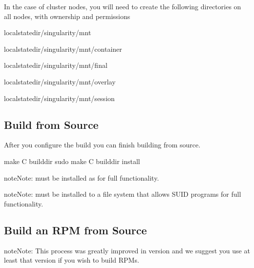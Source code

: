 \documentclass[letterpaper,10pt,english]{sphinxmanual}
\begin{document}
In the case of cluster nodes, you will need to create the following
directories on all nodes, with  ownership and  permissions

%
\begin{sphinxVerbatim}[commandchars=\\\{\}]
\PYGZdl{}\PYGZob{}localstatedir\PYGZcb{}/singularity/mnt

\PYGZdl{}\PYGZob{}localstatedir\PYGZcb{}/singularity/mnt/container

\PYGZdl{}\PYGZob{}localstatedir\PYGZcb{}/singularity/mnt/final

\PYGZdl{}\PYGZob{}localstatedir\PYGZcb{}/singularity/mnt/overlay

\PYGZdl{}\PYGZob{}localstatedir\PYGZcb{}/singularity/mnt/session
\end{sphinxVerbatim}


\subsection{Build from Source}
\label{\detokenize{admin_quickstart:build-from-source}}
After you configure the build you can finish building  from
source.

%
\begin{sphinxVerbatim}[commandchars=\\\{\}]
\PYGZdl{} make \PYGZhy{}C builddir
\PYGZdl{} sudo make \PYGZhy{}C builddir install
\end{sphinxVerbatim}

\begin{sphinxadmonition}{note}{Note:}
 must be installed as  for full functionality.
\end{sphinxadmonition}

\begin{sphinxadmonition}{note}{Note:}
 must be installed to a file system that allows SUID
programs for full functionality.
\end{sphinxadmonition}


\subsection{Build an RPM from Source}
\label{\detokenize{admin_quickstart:build-an-rpm-from-source}}
\begin{sphinxadmonition}{note}{Note:}
This process was greatly improved in version  and we suggest
you use at least that version if you wish to build RPMs.
\end{sphinxadmonition}
\end{document}
